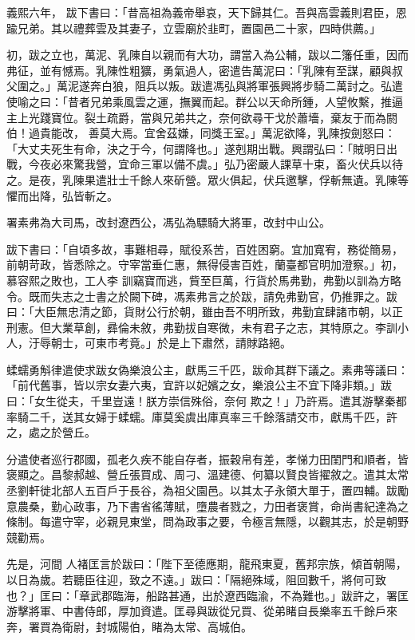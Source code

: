\begin{pinyinscope}
 義熙六年，
 跋下書曰：「昔高祖為義帝舉哀，天下歸其仁。吾與高雲義則君臣，恩踰兄弟。其以禮葬雲及其妻子，立雲廟於韭町，置園邑二十家，四時供薦。」



 初，跋之立也，萬泥、乳陳自以親而有大功，謂當入為公輔，跋以二籓任重，因而弗征，並有憾焉。乳陳性粗獷，勇氣過人，密遣告萬泥曰：「乳陳有至謀，顧與叔父圍之。」萬泥遂奔白狼，阻兵以叛。跋遣馮弘與將軍張興將步騎二萬討之。弘遣使喻之曰：「昔者兄弟乘風雲之運，撫翼而起。群公以天命所鍾，人望攸繫，推逼主上光踐寶位。裂土疏爵，當與兄弟共之，奈何欲尋干戈於蕭墻，棄友于而為閼伯！過貴能改，
 善莫大焉。宜舍茲嫌，同獎王室。」萬泥欲降，乳陳按劍怒曰：「大丈夫死生有命，決之于今，何謂降也。」遂剋期出戰。興謂弘曰：「賊明日出戰，今夜必來驚我營，宜命三軍以備不虞。」弘乃密嚴人課草十束，畜火伏兵以待之。是夜，乳陳果遣壯士千餘人來斫營。眾火俱起，伏兵邀擊，俘斬無遺。乳陳等懼而出降，弘皆斬之。



 署素弗為大司馬，改封遼西公，馮弘為驃騎大將軍，改封中山公。



 跋下書曰：「自頃多故，事難相尋，賦役系苦，百姓困窮。宜加寬宥，務從簡易，前朝苛政，皆悉除之。守宰當垂仁惠，無得侵害百姓，蘭臺都官明加澄察。」初，慕容熙之敗也，工人李
 訓竊寶而逃，貲至巨萬，行貨於馬弗勤，弗勤以訓為方略令。既而失志之士書之於闕下碑，馮素弗言之於跋，請免弗勤官，仍推罪之。跋曰：「大臣無忠清之節，貨財公行於朝，雖由吾不明所致，弗勤宜肆諸市朝，以正刑憲。但大業草創，彞倫未敘，弗勤拔自寒微，未有君子之志，其特原之。李訓小人，汙辱朝士，可東市考竟。」於是上下肅然，請賕路絕。



 蝚蠕勇斛律遣使求跋女偽樂浪公主，獻馬三千匹，跋命其群下議之。素弗等議曰：「前代舊事，皆以宗女妻六夷，宜許以妃嬪之女，樂浪公主不宜下降非類。」跋曰：「女生從夫，千里豈遠！朕方崇信殊俗，奈何
 欺之！」乃許焉。遣其游擊秦都率騎二千，送其女婦于蝚蠕。庫莫奚虞出庫真率三千餘落請交市，獻馬千匹，許之，處之於營丘。



 分遣使者巡行郡國，孤老久疾不能自存者，振穀帛有差，孝悌力田閨門和順者，皆褒顯之。昌黎郝越、營丘張買成、周刁、溫建德、何纂以賢良皆擢敘之。遣其太常丞劉軒徙北部人五百戶于長谷，為祖父園邑。以其太子永領大單于，置四輔。跋勵意農桑，勤心政事，乃下書省徭薄賦，墮農者戮之，力田者褒賞，命尚書紀達為之條制。每遣守宰，必親見東堂，問為政事之要，令極言無隱，以觀其志，於是朝野競勸焉。



 先是，河間
 人褚匡言於跋曰：「陛下至德應期，龍飛東夏，舊邦宗族，傾首朝陽，以日為歲。若聽臣往迎，致之不遠。」跋曰：「隔絕殊域，阻回數千，將何可致也？」匡曰：「章武郡臨海，船路甚通，出於遼西臨渝，不為難也。」跋許之，署匡游擊將軍、中書侍郎，厚加資遣。匡尋與跋從兄買、從弟睹自長樂率五千餘戶來奔，署買為衛尉，封城陽伯，睹為太常、高城伯。




\end{pinyinscope}
